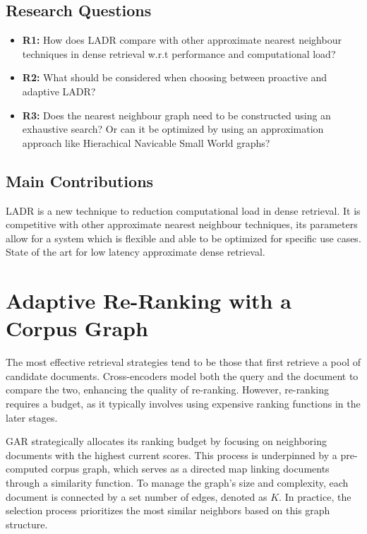 \documentclass[sigconf,authorversion,nonacm]{acmart}
\begin{document}
\subsection{Research Questions}

\begin{itemize}

	\item \textbf{R1:} How does LADR compare with other approximate nearest neighbour techniques in
	      dense retrieval w.r.t performance and computational load?

	\item \textbf{R2:} What should be considered when choosing between proactive and adaptive LADR?

	\item \textbf{R3:} Does the nearest neighbour graph need to be constructed using an exhaustive
	      search? Or can it be optimized by using an approximation approach like Hierachical
	      Navicable Small World graphs?\cite{hnsw}

\end{itemize}


\subsection{Main Contributions}

LADR is a new technique to reduction computational load in dense retrieval. It is competitive with
other approximate nearest neighbour techniques, its parameters allow for a system which is flexible
and able to be optimized for specific use cases. State of the art for low latency approximate dense
retrieval.

\section{Adaptive Re-Ranking with a Corpus Graph}

The most effective retrieval strategies tend to be those that first retrieve a pool of candidate
documents. Cross-encoders model both the query and the document to compare the two, enhancing the
quality of re-ranking. However, re-ranking requires a budget, as it typically involves using
expensive ranking functions in the later stages.

GAR strategically allocates its ranking budget by focusing on neighboring documents with the highest
current scores. This process is underpinned by a pre-computed corpus graph, which serves as a
directed map linking documents through a similarity function. To manage the graph's size and
complexity, each document is connected by a set number of edges, denoted as \(K\). In practice, the
selection process prioritizes the most similar neighbors based on this graph structure.
\end{document}
